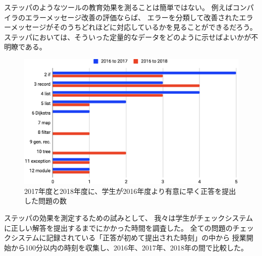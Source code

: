 ステッパのようなツールの教育効果を測ることは簡単ではない。
例えばコンパイラのエラーメッセージ改善の評価ならば、
エラーを分類して改善されたエラーメッセージがそのうちどれほどに対応しているかを見ることができるだろう。
ステッパにおいては、そういった定量的なデータをどのように示せばよいかが不明瞭である。

\begin{figure}
  \begin{center}
    \includegraphics[width=15cm]{6/table2.eps}
    \caption[学生が正答するまでの時間の比較]{
        2017年度と2018年度に、学生が2016年度より有意に早く正答を提出した問題の数
    }
    \label{figure:p}
  \end{center}
\end{figure}

ステッパの効果を測定するための試みとして、
我々は学生がチェックシステムに正しい解答を提出するまでにかかった時間を調査した。
全ての問題のチェックシステムに記録されている「正答が初めて提出された時刻」の中から
授業開始から100分以内の時刻を収集し、2016年、2017年、2018年の間で比較した。

